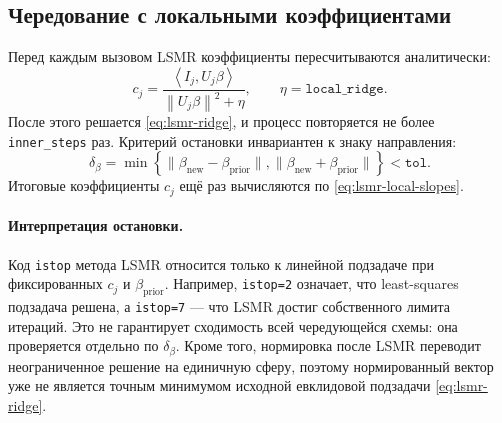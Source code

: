 \subsection{Чередование с локальными коэффициентами}

Перед каждым вызовом LSMR коэффициенты пересчитываются аналитически:
\begin{equation}
 c_j
 =
 \frac{\left\langle I_j,U_j\beta\right\rangle}
 {\left\|U_j\beta\right\|^2+\eta},
 \qquad
 \eta=\texttt{local\_ridge}.
 \label{eq:lsmr-local-slopes}
\end{equation}
После этого решается \eqref{eq:lsmr-ridge}, и процесс повторяется не более
\texttt{inner\_steps} раз. Критерий остановки инвариантен к знаку направления:
\[
 \delta_\beta
 =
 \min\left\{
  \|\beta_{\mathrm{new}}-\beta_{\mathrm{prior}}\|,
  \|\beta_{\mathrm{new}}+\beta_{\mathrm{prior}}\|
 \right\}
 <\texttt{tol}.
\]
Итоговые коэффициенты \(c_j\) ещё раз вычисляются по
\eqref{eq:lsmr-local-slopes}.

\paragraph{Интерпретация остановки.}
Код \texttt{istop} метода LSMR относится только к линейной подзадаче при
фиксированных \(c_j\) и \(\beta_{\mathrm{prior}}\).
Например, \texttt{istop=2} означает, что least-squares подзадача решена,
а \texttt{istop=7} --- что LSMR достиг собственного лимита итераций.
Это не гарантирует сходимость всей чередующейся схемы: она проверяется
отдельно по \(\delta_\beta\). Кроме того, нормировка после LSMR переводит
неограниченное решение на единичную сферу, поэтому нормированный вектор уже
не является точным минимумом исходной евклидовой подзадачи
\eqref{eq:lsmr-ridge}.
